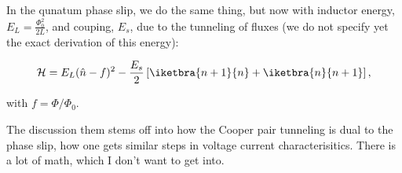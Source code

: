  \noindent In the qunatum phase slip, we do the same thing, but now with
 inductor energy, $  E_L = \frac{\Phi_0^2}{2L} $, and couping,  $ E_s $,
 due  to the  tunneling  of fluxes  (we  do not  specify  yet the  exact
 derivation of this energy):

 \begin{equation}\label{key}
   \mathcal{H} = E_L(\hat{n} - f)^2 - \frac{E_s}{2}\left[\iketbra{n+1}{n} + \iketbra{n}{n+1}\right],
 \end{equation}

 \noindent with $ f = \Phi/\Phi_0 $.

 \begin{framed}\noindent
   \noindent  The discussion  them stems  off into  how the  Cooper pair
   tunneling is  dual to the phase  slip, how one gets  similar steps in
   voltage current  characterisitics. There  is a lot  of math,  which I
   don't want to get into.
 \end{framed}



 \newpage
